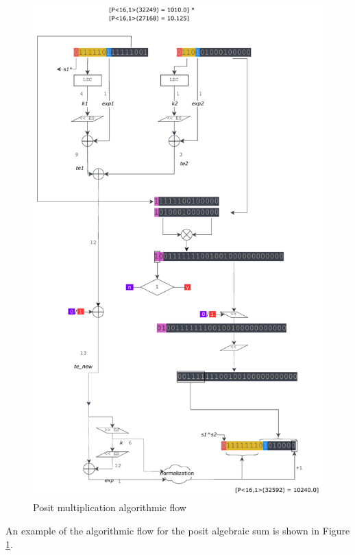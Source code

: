 \begin{figure}
    \begin{center}
    \includegraphics[width=\textwidth]{figures/posit_mul_flow.pdf}
    \caption{Posit multiplication algorithmic flow}
    \label{fig:mulflow}
    \end{center}
\end{figure}

An example of the algorithmic flow for the posit algebraic sum is shown in Figure \ref{fig:mulflow}.

